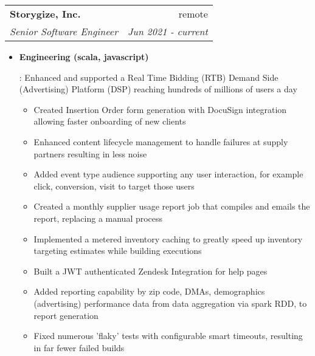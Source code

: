 \documentclass[letterpaper,10pt]{article}
\makeatletter
\newcommand{\resumeItem}[2]{
  \item\small{
    \textbf{#1}{: #2 \vspace{-2pt}}
  }
}
\newcommand{\resumeSubheading}[4]{
  \vspace{-1pt}\item[]
  \begin{tabular*}{0.98\textwidth}{l@{\extracolsep{\fill}}r}
      \hspace{-10pt}\textbf{#1} & #2 \\
      \hspace{-10pt}\textit{\small#3} & \textit{\small #4} \\
    \end{tabular*}\vspace{-5pt}
}
\newcommand{\resumeItemListStart}{\begin{itemize}}
\newcommand{\resumeItemListEnd}{\end{itemize}\vspace{-5pt}}
\makeatother
\begin{document}
    \resumeSubheading
      {Storygize, Inc.}{remote}
      {Senior Software Engineer}{Jun 2021 - current}
      \resumeItemListStart
        \resumeItem{Engineering (scala, javascript)}
          {Enhanced and supported a Real Time Bidding (RTB) Demand Side (Advertising) Platform (DSP) reaching hundreds of millions of users a day
            \begin{itemize}
                \item Created Insertion Order form generation with DocuSign integration allowing faster onboarding of new clients
                \item Enhanced content lifecycle management to handle failures at supply partners resulting in less noise
                \item Added event type audience supporting any user interaction, for example click, conversion, visit to target those users
                \item Created a monthly supplier usage report job that compiles and emails the report, replacing a manual process
                \item Implemented a metered inventory caching to greatly speed up inventory targeting estimates while building executions
                \item Built a JWT authenticated Zendesk Integration for help pages
                \item Added reporting capability by zip code, DMAs, demographics (advertising) performance data from data aggregation via spark RDD, to report generation
                \item Fixed numerous 'flaky' tests with configurable smart timeouts, resulting in far fewer failed builds
            \end{itemize}
            }
    \resumeItemListEnd
\end{document}
